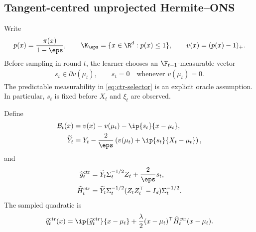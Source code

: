 %
%

\subsection{Tangent-centred unprojected Hermite--ONS}
\label{sec:ctr-unprojected}

Write
\begin{align}
    p(x)=\frac{\pi(x)}{1-\eps},
    \qquad
    \K_\eps=\{x\in\R^d:p(x)\leq1\},
    \qquad
    v(x)=(p(x)-1)_+.
    \label{eq:ctr-p-v}
\end{align}
Before sampling in round $t$, the learner chooses an $\F_{t-1}$-measurable
vector
\begin{align}
    s_t\in\partial v(\mu_t),
    \qquad
    s_t=0\quad\text{whenever }v(\mu_t)=0.
    \label{eq:ctr-selector}
\end{align}
The predictable measurability in \eqref{eq:ctr-selector} is an explicit oracle
assumption.  In particular, $s_t$ is fixed before $X_t$ and $\xi_t$ are
observed.

Define
\begin{align}
    \mathcal B_t(x)
     & =v(x)-v(\mu_t)-\ip{s_t}{x-\mu_t},
    \label{eq:ctr-B-definition}
    \\
    \widetilde Y_t
     & =Y_t-\frac2\eps
    \left(
    v(\mu_t)+\ip{s_t}{X_t-\mu_t}
    \right),
    \label{eq:ctr-Y-definition}
\end{align}
and
\begin{align}
    \widehat g_t^{\mathrm{ctr}}
     & =\widetilde Y_t\Sigma_t^{-1/2}Z_t+\frac2\eps s_t,
    \label{eq:ctr-g-definition}
    \\
    \widehat H_t^{\mathrm{ctr}}
     & =\widetilde Y_t\Sigma_t^{-1/2}
    (Z_tZ_t^\top-I_d)\Sigma_t^{-1/2}.
    \label{eq:ctr-H-definition}
\end{align}
The sampled quadratic is
\begin{align}
    \widehat q_t^{\mathrm{ctr}}(x)
    =\ip{\widehat g_t^{\mathrm{ctr}}}{x-\mu_t}
    +\frac\lambda2
    (x-\mu_t)^\top\widehat H_t^{\mathrm{ctr}}(x-\mu_t).
    \label{eq:ctr-qhat-definition}
\end{align}

